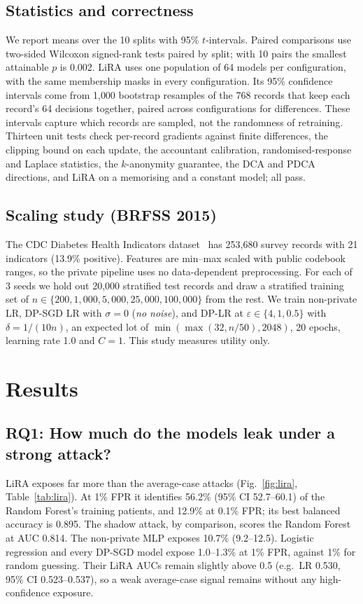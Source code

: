 \documentclass[conference]{IEEEtran}
\newcommand{\eps}{\varepsilon}
\begin{document}
\subsection{Statistics and correctness}
We report means over the 10 splits with 95\% $t$-intervals. Paired comparisons use two-sided Wilcoxon signed-rank tests paired by split; with 10 pairs the smallest attainable $p$ is 0.002. LiRA uses one population of 64 models per configuration, with the same membership masks in every configuration. Its 95\% confidence intervals come from 1{,}000 bootstrap resamples of the 768 records that keep each record's 64 decisions together, paired across configurations for differences. These intervals capture which records are sampled, not the randomness of retraining. Thirteen unit tests check per-record gradients against finite differences, the clipping bound on each update, the accountant calibration, randomised-response and Laplace statistics, the $k$-anonymity guarantee, the DCA and PDCA directions, and LiRA on a memorising and a constant model; all pass.

\subsection{Scaling study (BRFSS 2015)}
The CDC Diabetes Health Indicators dataset~\cite{brfss} has 253{,}680 survey records with 21 indicators (13.9\% positive). Features are min--max scaled with public codebook ranges, so the private pipeline uses no data-dependent preprocessing. For each of 3 seeds we hold out 20{,}000 stratified test records and draw a stratified training set of $n\in\{200, 1{,}000, 5{,}000, 25{,}000, 100{,}000\}$ from the rest. We train non-private LR, DP-SGD LR with $\sigma{=}0$ (\emph{no noise}), and DP-LR at $\eps\in\{4,1,0.5\}$ with $\delta{=}1/(10n)$, an expected lot of $\min(\max(32,n/50),2048)$, 20 epochs, learning rate 1.0 and $C{=}1$. This study measures utility only.

\section{Results}
\subsection{RQ1: How much do the models leak under a strong attack?}
LiRA exposes far more than the average-case attacks (Fig.~\ref{fig:lira}, Table~\ref{tab:lira}). At 1\% FPR it identifies 56.2\% (95\% CI 52.7--60.1) of the Random Forest's training patients, and 12.9\% at 0.1\% FPR; its best balanced accuracy is 0.895. The shadow attack, by comparison, scores the Random Forest at AUC 0.814. The non-private MLP exposes 10.7\% (9.2--12.5). Logistic regression and every DP-SGD model expose 1.0--1.3\% at 1\% FPR, against 1\% for random guessing. Their LiRA AUCs remain slightly above 0.5 (e.g.\ LR 0.530, 95\% CI 0.523--0.537), so a weak average-case signal remains without any high-confidence exposure.
\end{document}
